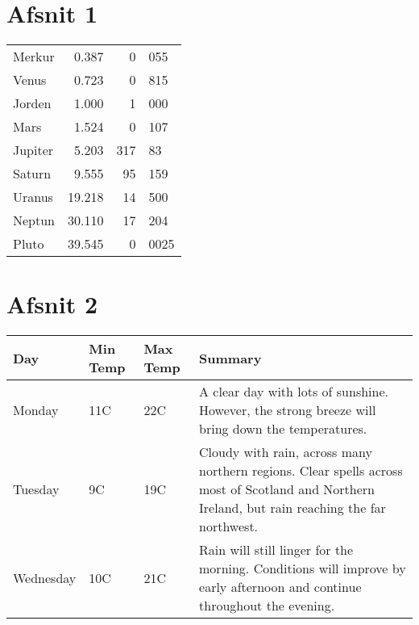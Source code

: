 \documentclass{article}
\begin{document}
\section{Afsnit 1}

\begin{tabular}{l|r|r@{,}l} %
Merkur  & 0.387 & 0&055 \\
Venus & 0.723 & 0&815 \\
Jorden & 1.000 & 1&000 \\
Mars & 1.524 & 0&107 \\
\cline{2-2} %
Jupiter & 5.203 & 317&83 \\
Saturn & 9.555 & 95&159 \\
\hline %
\hline %
Uranus & 19.218 & 14&500 \\
Neptun & 30.110 & 17&204 \\
Pluto & 39.545 & 0&0025 \\
\hline %
\hline %
\end{tabular}

\section{Afsnit 2}

\begin{center}
    \begin{tabular}{ | l | l | l | p{5cm} |} 
    
    \hline
    Day & Min Temp & Max Temp & Summary \\ \hline
    Monday & 11C & 22C & A clear day with lots of sunshine.  
    However, the strong breeze will bring down the temperatures. \\ \hline
    Tuesday & 9C & 19C & Cloudy with rain, across many northern regions. Clear spells
    across most of Scotland and Northern Ireland,
    but rain reaching the far northwest. \\ \hline
    Wednesday & 10C & 21C & Rain will still linger for the morning.
    Conditions will improve by early afternoon and continue
    throughout the evening. \\
    \hline
    \end{tabular}
\end{center}
\end{document}
